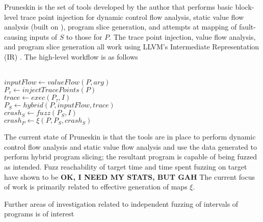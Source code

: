 \documentclass[11pt]{acmart}
\begin{document}
\begin{multicols}{2}
Pruneskin is the set of tools developed by the author that performs basic block-level trace point injection for dynamic control flow analysis, static value flow analysis (built on \cite{SVF}), program slice generation, and attempts at mapping of fault-causing inputs of $S$ to those for $P$. The trace point injection, value flow analysis, and program slice generation all work using LLVM's Intermediate Representation (IR) \cite{LLVM}
\cite{LLVMIR}. The high-level workflow is as follows
\begin{algorithm}[H]
\hrulefill\\
$inputFlow\leftarrow valueFlow(P, arg)$\\
$P_\tau \leftarrow injectTracePoints(P)$\\
$trace \leftarrow exec(P_\tau, I)$\\
$P_S \leftarrow hybrid(P, inputFlow, trace)$\\
$crash_{S} \leftarrow fuzz(P_{S}, I)$\\
$crash_{P} \leftarrow \xi(P, P_{S}, crash_{S})$
\end{algorithm}

The current state of Pruneskin is that the tools are in place to perform dynamic control flow analysis and static value flow analysis and
use the data generated to perform hybrid program slicing; the resultant program is capable of being fuzzed as intended. Fuzz 
reachability of target time and time spent fuzzing on target have shown to be \textbf{OK, I NEED MY STATS, BUT GAH} The current focus
of work is primarily related to effective generation of maps $\xi$.

Further areas of investigation related to independent fuzzing of intervals of programs is of interest


\end{multicols}
\end{document}
